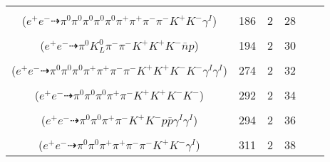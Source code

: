 \documentclass[landscape]{article}
\newcounter{rownumbers}
\newcommand\rn{\stepcounter{rownumbers}\arabic{rownumbers}}
\newcommand{\EOL}{\\} %
\newcommand{\topoTags}[1]{#1} %
\begin{document}
\begin{longtable}{clcccc}
\rn & \makecell[l]{ $ 
e^{+} e^{-} \rightarrow \pi^{0} \pi^{0} \pi^{0} \pi^{0} \pi^{0} \rho^{0} \pi^{-} \bar{K}^{*} K^{+} \gamma^{I} ,
\rho^{0} \rightarrow \pi^{+} \pi^{-} ,
\bar{K}^{*} \rightarrow \pi^{+} K^{-} 
$ \\ ($
e^{+} e^{-} \dashrightarrow \pi^{0} \pi^{0} \pi^{0} \pi^{0} \pi^{0} \pi^{+} \pi^{+} \pi^{-} \pi^{-} K^{+} K^{-} \gamma^{I} 
$) } & \topoTags{186 & }2 & 28 \EOL

\rn & \makecell[l]{ $ 
e^{+} e^{-} \rightarrow \pi^{0} K^{0} K^{+} K^{+} K^{-} \bar{n} \Xi^{-} ,
K^{0} \rightarrow K_{L}^{0} ,
\Xi^{-} \rightarrow \pi^{-} \Lambda ,
\Lambda \rightarrow \pi^{-} p 
$ \\ ($
e^{+} e^{-} \dashrightarrow \pi^{0} K_{L}^{0} \pi^{-} \pi^{-} K^{+} K^{+} K^{-} \bar{n} p 
$) } & \topoTags{194 & }2 & 30 \EOL

\rn & \makecell[l]{ $ 
e^{+} e^{-} \rightarrow \pi^{0} \pi^{0} \pi^{-} \rho^{+} K^{*} \bar{K}^{*} K^{+} K^{-} \gamma^{I} \gamma^{I} ,
\rho^{+} \rightarrow \pi^{0} \pi^{+} ,
K^{*} \rightarrow \pi^{-} K^{+} ,
\bar{K}^{*} \rightarrow \pi^{+} K^{-} 
$ \\ ($
e^{+} e^{-} \dashrightarrow \pi^{0} \pi^{0} \pi^{0} \pi^{+} \pi^{+} \pi^{-} \pi^{-} K^{+} K^{+} K^{-} K^{-} \gamma^{I} \gamma^{I} 
$) } & \topoTags{274 & }2 & 32 \EOL

\rn & \makecell[l]{ $ 
e^{+} e^{-} \rightarrow \omega K^{+} K^{-} K^{*+} K^{*-} ,
\omega \rightarrow \pi^{0} \pi^{+} \pi^{-} ,
K^{*+} \rightarrow \pi^{0} K^{+} ,
K^{*-} \rightarrow \pi^{0} K^{-} 
$ \\ ($
e^{+} e^{-} \dashrightarrow \pi^{0} \pi^{0} \pi^{0} \pi^{+} \pi^{-} K^{+} K^{+} K^{-} K^{-} 
$) } & \topoTags{292 & }2 & 34 \EOL

\rn & \makecell[l]{ $ 
e^{+} e^{-} \rightarrow \rho^{+} \rho^{-} K^{+} K^{-} p \bar{p} \gamma^{I} \gamma^{I} ,
\rho^{+} \rightarrow \pi^{0} \pi^{+} ,
\rho^{-} \rightarrow \pi^{0} \pi^{-} 
$ \\ ($
e^{+} e^{-} \dashrightarrow \pi^{0} \pi^{0} \pi^{+} \pi^{-} K^{+} K^{-} p \bar{p} \gamma^{I} \gamma^{I} 
$) } & \topoTags{294 & }2 & 36 \EOL

\rn & \makecell[l]{ $ 
e^{+} e^{-} \rightarrow \pi^{0} \pi^{+} \pi^{+} \rho^{-} K^{*} K^{-} \gamma^{I} ,
\rho^{-} \rightarrow \pi^{0} \pi^{-} ,
K^{*} \rightarrow \pi^{-} K^{+} 
$ \\ ($
e^{+} e^{-} \dashrightarrow \pi^{0} \pi^{0} \pi^{+} \pi^{+} \pi^{-} \pi^{-} K^{+} K^{-} \gamma^{I} 
$) } & \topoTags{311 & }2 & 38 \EOL


\end{longtable}
\end{document}
